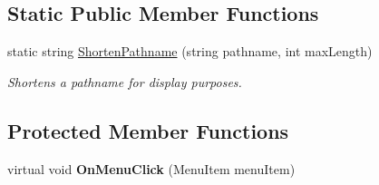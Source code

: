 \subsection*{Static Public Member Functions}
\begin{DoxyCompactItemize}
\item 
static string \hyperlink{class_power_system_planning_wpf_app_1_1_control_utils_1_1_recent_file_list_a98ebf9d14956e17f7973efde04d5281b}{Shorten\+Pathname} (string pathname, int max\+Length)
\begin{DoxyCompactList}\small\item\em Shortens a pathname for display purposes. \end{DoxyCompactList}\end{DoxyCompactItemize}
\subsection*{Protected Member Functions}
\begin{DoxyCompactItemize}
\item 
virtual void {\bfseries On\+Menu\+Click} (Menu\+Item menu\+Item)\hypertarget{class_power_system_planning_wpf_app_1_1_control_utils_1_1_recent_file_list_aa49aa79c00c1fed4603b820e7fa4d429}{}\label{class_power_system_planning_wpf_app_1_1_control_utils_1_1_recent_file_list_aa49aa79c00c1fed4603b820e7fa4d429}

\end{DoxyCompactItemize}
